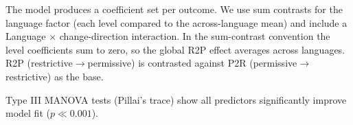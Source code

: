 The model produces a coefficient set per outcome. We use
sum contrasts for the language factor (each level compared to the
across-language mean) and include a Language $\times$ change-direction
interaction. In the sum-contrast convention the level
coefficients sum to zero, so the global R2P effect averages across
languages. R2P (restrictive$\rightarrow$permissive) is contrasted
against P2R (permissive$\rightarrow$restrictive) as the base.

Type III MANOVA tests (Pillai's trace) show all predictors
significantly improve model fit ($p \ll 0.001$).

